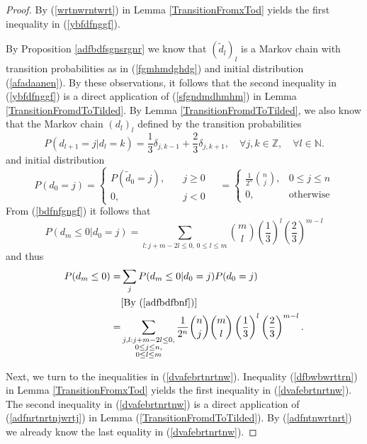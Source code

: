 \documentclass[a4paper,aps,floatfix]{revtex4}
\begin{document}
\begin{proof}

By (\ref{wrtnwrntwrt}) in Lemma \ref{TransitionFromxTod} yields the  first  inequality in  (\ref{ybfdfnggf}).

By Proposition \ref{adfbdfsgnsrgnr} we know that $(\tilde{d}_l)_l$ is a Markov chain with transition probabilities as in (\ref{fgmhmdghdg}) and initial distribution (\ref{afadaanen}). By these observations, it follows that the  second inequality  in (\ref{ybfdfnggf}) is a direct application of (\ref{sfgndmdhmhm}) in Lemma \ref{TransitionFromdToTilded}. 
By Lemma \ref{TransitionFromdToTilded}, we also know that the Markov chain $(d_l)_l$ defined by the transition probabilities
\begin{equation}
\label{bdfnfgngf}
P(d_{l+1} = j|d_{l} = k) = \frac{1}{3}\delta_{j,k-1} + \frac{2}{3}\delta_{j,k+1},\quad \forall j,k\in\mathbb{Z},\quad \forall l\in\mathbb{N}.
\end{equation}
and initial distribution
\begin{equation}
\label{adfbdfbnf}
P(d_0 = j) = \left\{\begin{matrix}
P(\tilde{d}_0 = j), & \quad j \geq 0\\
0 , & \quad  j <0
\end{matrix}\right. \quad=  \left\{\begin{matrix} \frac{1}{2^n}\binom{n}{j}, & 0\leq j\leq n\\
0, & \mathrm{otherwise}
\end{matrix}\right.
\end{equation}
From (\ref{bdfnfgngf}) it follows that 
\begin{equation}
\label{adfntnwrtnrt}
P(d_m\leq 0|d_0 = j) = \sum_{l: j+m-2l\leq 0,\, 0\leq l\leq m} \binom{m}{l}  \left(\frac{1}{3}\right)^{l}\left(\frac{2}{3}\right)^{m-l}
\end{equation}
and thus 
\begin{equation}
\label{afdbajsrtjsj}
\begin{split}
P(d_m\leq 0) = & \sum_j P(d_m\leq 0|d_0 = j)P(d_0 = j)\\
& [\textrm{By (\ref{adfbdfbnf})}]\\
 = & \sum_{\substack{j,l: j+ m-2l \leq 0,\\ 0 \leq j\leq n,\\ 0\leq l\leq m}}  \frac{1}{2^n}\binom{n}{j} \binom{m}{l}  \left(\frac{1}{3}\right)^{l}\left(\frac{2}{3}\right)^{m-l}.
\end{split}
\end{equation}


Next, we turn to the inequalities in (\ref{dvafebrtnrtnw}). 
Inequality (\ref{dfbwbwrttrn}) in Lemma \ref{TransitionFromxTod} yields the first inequality in (\ref{dvafebrtnrtnw}). The second inequality in (\ref{dvafebrtnrtnw}) is a direct application of 
(\ref{adfnrtnrtnjwrtj}) in Lemma (\ref{TransitionFromdToTilded}). By (\ref{adfntnwrtnrt}) we already know the last equality in (\ref{dvafebrtnrtnw}).

\end{proof}
\end{document}
